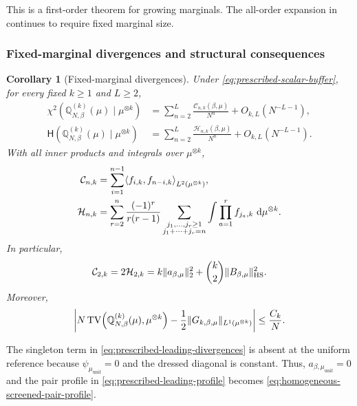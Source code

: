 \documentclass[11pt,reqno]{amsart}
\numberwithin{equation}{section}
\theoremstyle{plain}
\newtheorem{cor}[cor]{Corollary}
\theoremstyle{definition}
\DeclarePairedDelimiter{\norm}{\lVert}{\rVert}
\DeclarePairedDelimiter{\ip}{\langle}{\rangle}
\newcommand{\dd}{\mathop{}\!\mathrm d}
\newcommand{\Q}{\mathbb Q}
\newcommand{\TV}{\operatorname{TV}}
\newcommand{\HS}{\mathrm{HS}}
\newcommand{\be}{\beta}
\newcommand{\Hr}{\mathsf H}
\newcommand{\muunif}{\mu_{\mathrm{unif}}}
\begin{document}
This is a first-order theorem for growing marginals. The all-order expansion in  continues to require fixed marginal size.

\subsubsection{Fixed-marginal divergences and structural consequences}

\begin{cor}[Fixed-marginal divergences]
\label{cor:prescribed-divergence-expansions}
Under \eqref{eq:prescribed-scalar-buffer}, for every fixed $k\geq1$ and $L\geq2$,
\begin{align}
 \chi^2\!\left(\Q_{N,\be}^{(k)}(\mu)\mid\mu^{\otimes k}\right)
 &=\sum_{n=2}^{L}\frac{\mathcal C_{n,k}(\be,\mu)}{N^n}
 +O_{k,L}(N^{-L-1}),
 \label{eq:prescribed-chi-all-orders}\\
 \Hr\!\left(\Q_{N,\be}^{(k)}(\mu)\mid\mu^{\otimes k}\right)
 &=\sum_{n=2}^{L}\frac{\mathcal H_{n,k}(\be,\mu)}{N^n}
 +O_{k,L}(N^{-L-1}).
 \label{eq:prescribed-entropy-all-orders}
\end{align}
With all inner products and integrals over $\mu^{\otimes k}$,
\begin{align}
 \mathcal C_{n,k}
 &=\sum_{i=1}^{n-1}\ip*{f_{i,k},f_{n-i,k}}_{L^2(\mu^{\otimes k})},
 \label{eq:prescribed-chi-coefficients}\\
 \mathcal H_{n,k}
 &=\sum_{r=2}^{n}\frac{(-1)^r}{r(r-1)}
 \sum_{\substack{j_1,\ldots,j_r\geq1\\j_1+\cdots+j_r=n}}
 \int\prod_{a=1}^rf_{j_a,k}\,\dd\mu^{\otimes k}.
 \label{eq:prescribed-entropy-coefficients}
\end{align}
In particular,
\begin{equation}
 \mathcal C_{2,k}=2\mathcal H_{2,k}
 =k\norm{a_{\be,\mu}}_2^2
 +\binom{k}{2}\norm{B_{\be,\mu}}_{\HS}^2.
 \label{eq:prescribed-leading-divergences}
\end{equation}
Moreover,
\begin{equation}
 \left|N\TV\!\left(\Q_{N,\be}^{(k)}(\mu),\mu^{\otimes k}\right)
 -\frac12\norm{G_{k,\be,\mu}}_{L^1(\mu^{\otimes k})}\right|
 \leq\frac{C_k}{N}.
 \label{eq:prescribed-leading-TV}
\end{equation}
\end{cor}

The singleton term in \eqref{eq:prescribed-leading-divergences} is absent at the uniform reference because $\psi_{\muunif}=0$ and the dressed diagonal is constant.  Thus, $a_{\be,\muunif}=0$ and the pair profile in \eqref{eq:prescribed-leading-profile} becomes \eqref{eq:homogeneous-screened-pair-profile}.
\end{document}
